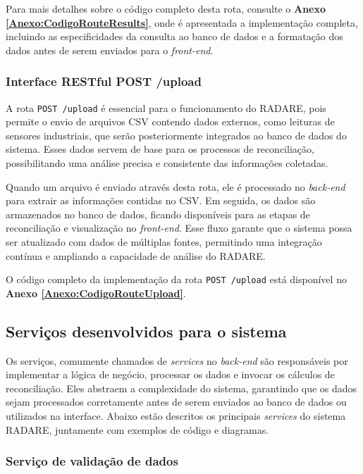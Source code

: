 Para mais detalhes sobre o código completo desta rota, consulte o \textbf{Anexo \ref{Anexo:CodigoRouteResults}}, onde é apresentada a implementação completa, incluindo as especificidades da consulta ao banco de dados e a formatação dos dados antes de serem enviados para o \textit{front-end}.

\subsubsection{Interface RESTful POST /upload}

A rota \texttt{POST /upload} é essencial para o funcionamento do RADARE, pois permite o envio de arquivos CSV contendo dados externos, como leituras de sensores industriais, que serão posteriormente integrados ao banco de dados do sistema. Esses dados servem de base para os processos de reconciliação, possibilitando uma análise precisa e consistente das informações coletadas.

Quando um arquivo é enviado através desta rota, ele é processado no \textit{back-end} para extrair as informações contidas no CSV. Em seguida, os dados são armazenados no banco de dados, ficando disponíveis para as etapas de reconciliação e visualização no \textit{front-end}. Esse fluxo garante que o sistema possa ser atualizado com dados de múltiplas fontes, permitindo uma integração contínua e ampliando a capacidade de análise do RADARE.

O código completo da implementação da rota \texttt{POST /upload} está disponível no \textbf{Anexo \ref{Anexo:CodigoRouteUpload}}.

\subsection{Serviços desenvolvidos para o sistema}

Os serviços, comumente chamados de \textit{services} no \textit{back-end} são responsáveis por implementar a lógica de negócio, processar os dados e invocar os cálculos de reconciliação. Eles abstraem a complexidade do sistema, garantindo que os dados sejam processados corretamente antes de serem enviados ao banco de dados ou utilizados na interface. Abaixo estão descritos os principais \textit{services} do sistema RADARE, juntamente com exemplos de código e diagramas.

\subsubsection{Serviço de validação de dados}

